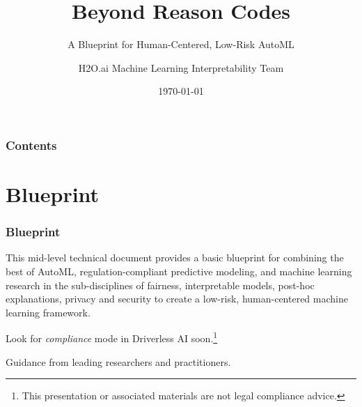 \documentclass[11pt,
               aspectratio=169,
               hyperref={colorlinks}
               ]{beamer}
\author{H2O.ai Machine Learning Interpretability Team}
\title{Beyond Reason Codes}
\subtitle{A Blueprint for Human-Centered, Low-Risk AutoML}
\institute{\href{https://www.h2o.ai}{H\textsubscript{2}O.ai}}
\date{\today}
\begin{document}
	
	\maketitle
	
	\begin{frame}
	
		\frametitle{Contents}
		
		\tableofcontents{}
		
	\end{frame}

	\section{Blueprint}
	
		\begin{frame}
		
			\frametitle{Blueprint}			
			
			This mid-level technical document provides a basic blueprint for combining the best of AutoML, regulation-compliant predictive modeling, and machine learning research in the sub-disciplines of fairness, interpretable models, post-hoc explanations, privacy and security to create a low-risk, human-centered machine learning framework.\\
			
			\vspace{10pt}			
			
			Look for \textit{compliance} mode in Driverless AI soon.\footnote{\tiny{This presentation or associated materials are not legal compliance advice.}}
			
			\vspace{10pt}			
			
			Guidance from leading researchers and practitioners.
					
		\end{frame}					
		
\end{document}
